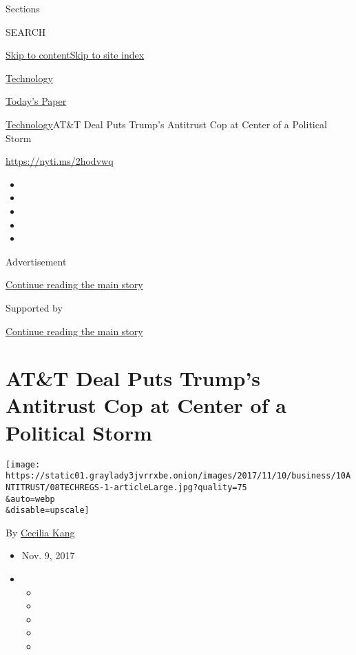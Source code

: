 Sections

SEARCH

\protect\hyperlink{site-content}{Skip to
content}\protect\hyperlink{site-index}{Skip to site index}

\href{https://www.nytimes3xbfgragh.onion/section/technology}{Technology}

\href{https://myaccount.nytimes3xbfgragh.onion/auth/login?response_type=cookie\&client_id=vi}{}

\href{https://www.nytimes3xbfgragh.onion/section/todayspaper}{Today's
Paper}

\href{/section/technology}{Technology}\textbar{}AT\&T Deal Puts Trump's
Antitrust Cop at Center of a Political Storm

\url{https://nyti.ms/2hodvwq}

\begin{itemize}
\item
\item
\item
\item
\item
\end{itemize}

Advertisement

\protect\hyperlink{after-top}{Continue reading the main story}

Supported by

\protect\hyperlink{after-sponsor}{Continue reading the main story}

\hypertarget{att-deal-puts-trumps-antitrust-cop-at-center-of-a-political-storm}{%
\section{AT\&T Deal Puts Trump's Antitrust Cop at Center of a Political
Storm}\label{att-deal-puts-trumps-antitrust-cop-at-center-of-a-political-storm}}

\texttt{[image: https://static01.graylady3jvrrxbe.onion/images/2017/11/10/business/10ANTITRUST/08TECHREGS-1-articleLarge.jpg?quality=75\\\&auto=webp\\\&disable=upscale]}

By \href{http://www.nytimes3xbfgragh.onion/by/cecilia-kang}{Cecilia
Kang}

\begin{itemize}
\item
  Nov. 9, 2017
\item
  \begin{itemize}
  \item
  \item
  \item
  \item
  \item
  \end{itemize}
\end{itemize}

